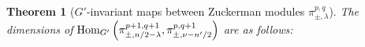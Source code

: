 \documentclass[10pt]{article} %
\newtheorem{theorem}{Theorem}
\newcommand{\Hom}{\mbox{\normalfont Hom}}
\theoremstyle{definition}
\begin{document}
\begin{theorem}[$G'$-invariant maps between Zuckerman modules $\pi_{\pm,\lambda}^{p,q}$]
	The dimensions of $\Hom_{G'}\left(\pi_{\pm,{n}/{2}-\lambda}^{p+1,q+1} ,\pi_{\pm,\nu-{n'}/{2}}^{p,q+1} \right)$
	are as follows:\newline
{}
\end{theorem}


\end{document}
